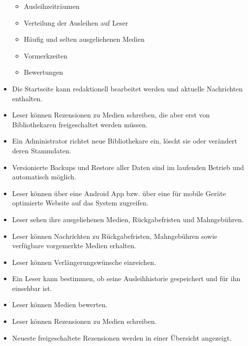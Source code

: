 \documentclass[fontsize=12pt,paper=a4,twoside]{scrartcl}
\begin{document}
\begin{itemize}
\begin{itemize}
\item Ausleihzeiträumen
\item Verteilung der Ausleihen auf Leser
\item Häufig und selten ausgeliehenen Medien
\item Vormerkzeiten
\item Bewertungen
\end{itemize}
\item Die Startseite kann redaktionell bearbeitet werden und aktuelle Nachrichten enthalten.
\item Leser können Rezensionen zu Medien schreiben, die aber erst von Bibliothekaren freigeschaltet werden müssen.
\item Ein Administrator richtet neue Bibliothekare ein, löscht sie oder verändert deren Stammdaten.
\item Versionierte Backups und Restore aller Daten sind im laufenden Betrieb und automatisch möglich.
\item Leser können über eine Android App bzw. über eine für mobile Geräte optimierte Website auf das System zugreifen.
\item Leser sehen ihre ausgeliehenen Medien, Rückgabefristen und Mahngebühren.
\item Leser können Nachrichten zu Rückgabefristen, Mahngebühren sowie verfügbare vorgemerkte Medien erhalten.
\item Leser können Verlängerungswünsche einreichen.
\item Ein Leser kann bestimmen, ob seine Ausleihhistorie gespeichert und für ihn einsehbar ist.
\item Leser können Medien bewerten.
\item Leser können Rezensionen zu Medien schreiben.
\item Neueste freigeschaltete Rezensionen werden in einer Übersicht angezeigt.


\end{itemize}
\end{document}
